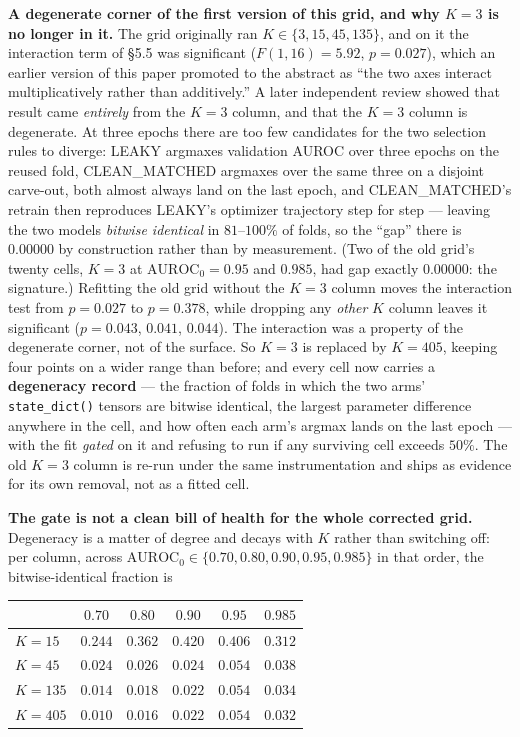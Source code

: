 \documentclass[10pt]{article} %
\begin{document}
\textbf{A degenerate corner of the first version of this grid, and why $K=3$
is no longer in it.} The grid originally ran $K\in\{3,15,45,135\}$, and on it
the interaction term of §5.5 was significant ($F(1,16)=5.92$, $p=0.027$), which
an earlier version of this paper promoted to the abstract as ``the two axes
interact multiplicatively rather than additively.'' A later independent review
showed that result came \emph{entirely} from the $K=3$ column, and that the
$K=3$ column is degenerate. At three epochs there are too few candidates for
the two selection rules to diverge: LEAKY argmaxes validation AUROC over three
epochs on the reused fold, CLEAN\_MATCHED argmaxes over the same three on a
disjoint carve-out, both almost always land on the last epoch, and
CLEAN\_MATCHED's retrain then reproduces LEAKY's optimizer trajectory step for
step --- leaving the two models \emph{bitwise identical} in $81$--$100\%$ of
folds, so the ``gap'' there is $0.00000$ by construction rather than by
measurement. (Two of the old grid's twenty cells, $K{=}3$ at
$\text{AUROC}_0=0.95$ and $0.985$, had gap exactly $0.00000$: the signature.)
Refitting the old grid without the $K=3$ column moves the interaction test
from $p=0.027$ to $p=0.378$, while dropping any \emph{other} $K$ column leaves
it significant ($p=0.043$, $0.041$, $0.044$). The interaction was a property of
the degenerate corner, not of the surface. So $K=3$ is replaced by $K=405$,
keeping four points on a wider range than before; and every cell now carries a
\textbf{degeneracy record} --- the fraction of folds in which the two arms'
\texttt{state\_dict()} tensors are bitwise identical, the largest parameter
difference anywhere in the cell, and how often each arm's argmax lands on the
last epoch --- with the fit \emph{gated} on it and refusing to run if any
surviving cell exceeds $50\%$. The old $K=3$ column is re-run under the same
instrumentation and ships as evidence for its own removal, not as a fitted
cell.

\textbf{The gate is not a clean bill of health for the whole corrected grid.}
Degeneracy is a matter of degree and decays with $K$ rather than switching off:
per column, across $\text{AUROC}_0\in\{0.70,0.80,0.90,0.95,0.985\}$ in that
order, the bitwise-identical fraction is

\begin{center}\small
\begin{tabular}{lccccc}
\toprule
 & $0.70$ & $0.80$ & $0.90$ & $0.95$ & $0.985$ \\
\midrule
$K=15$  & $0.244$ & $0.362$ & $0.420$ & $0.406$ & $0.312$ \\
$K=45$  & $0.024$ & $0.026$ & $0.024$ & $0.054$ & $0.038$ \\
$K=135$ & $0.014$ & $0.018$ & $0.022$ & $0.054$ & $0.034$ \\
$K=405$ & $0.010$ & $0.016$ & $0.022$ & $0.054$ & $0.032$ \\
\bottomrule
\end{tabular}
\end{center}
\end{document}
